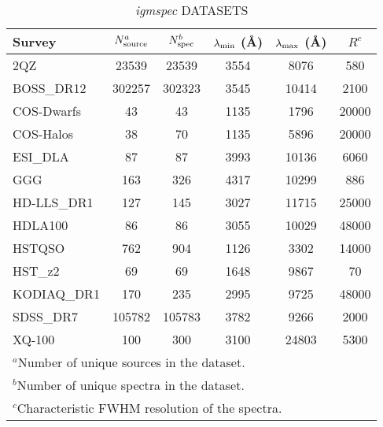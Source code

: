\clearpage
\begin{table}[ht]
\caption{{\it igmspec} DATASETS \label{tab:datasets}}
\begin{tabular}{lccccc}
Survey & $N_{\rm source}^a$ 
& $N_{\rm spec}^b$ & $\lambda_{\rm min}$ (\AA) 
& $\lambda_{\rm max}$ (\AA) & $R^c$ \\ 
\hline 
2QZ& 23539& 23539& 3554& 8076& 580\\ 
BOSS\_DR12& 302257& 302323& 3545& 10414& 2100\\ 
COS-Dwarfs& 43& 43& 1135& 1796& 20000\\ 
COS-Halos& 38& 70& 1135& 5896& 20000\\ 
ESI\_DLA& 87& 87& 3993& 10136& 6060\\ 
GGG& 163& 326& 4317& 10299& 886\\ 
HD-LLS\_DR1& 127& 145& 3027& 11715& 25000\\ 
HDLA100& 86& 86& 3055& 10029& 48000\\ 
HSTQSO& 762& 904& 1126& 3302& 14000\\ 
HST\_z2& 69& 69& 1648& 9867& 70\\ 
KODIAQ\_DR1& 170& 235& 2995& 9725& 48000\\ 
SDSS\_DR7& 105782& 105783& 3782& 9266& 2000\\ 
XQ-100& 100& 300& 3100& 24803& 5300\\ 
\hline 
\multicolumn{6}{l}{{$^a$}{Number of unique sources in the dataset. }} \\ 
\multicolumn{6}{l}{{$^b$}{Number of unique spectra in the dataset. }} \\ 
\multicolumn{6}{l}{{$^c$}{Characteristic FWHM resolution of the spectra. }} \\ 
\end{tabular} 
\end{table} 
